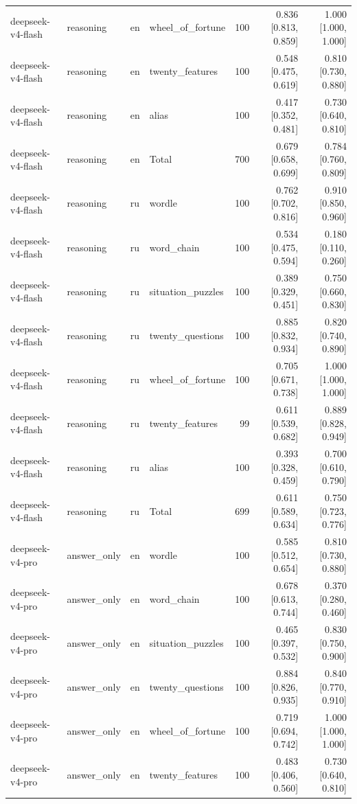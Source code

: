 \begin{longtable}{llllrrr}
deepseek-v4-flash & reasoning & en & wheel\_of\_fortune & 100 & 0.836 [0.813, 0.859] & 1.000 [1.000, 1.000] \\
deepseek-v4-flash & reasoning & en & twenty\_features & 100 & 0.548 [0.475, 0.619] & 0.810 [0.730, 0.880] \\
deepseek-v4-flash & reasoning & en & alias & 100 & 0.417 [0.352, 0.481] & 0.730 [0.640, 0.810] \\
deepseek-v4-flash & reasoning & en & Total & 700 & 0.679 [0.658, 0.699] & 0.784 [0.760, 0.809] \\
deepseek-v4-flash & reasoning & ru & wordle & 100 & 0.762 [0.702, 0.816] & 0.910 [0.850, 0.960] \\
deepseek-v4-flash & reasoning & ru & word\_chain & 100 & 0.534 [0.475, 0.594] & 0.180 [0.110, 0.260] \\
deepseek-v4-flash & reasoning & ru & situation\_puzzles & 100 & 0.389 [0.329, 0.451] & 0.750 [0.660, 0.830] \\
deepseek-v4-flash & reasoning & ru & twenty\_questions & 100 & 0.885 [0.832, 0.934] & 0.820 [0.740, 0.890] \\
deepseek-v4-flash & reasoning & ru & wheel\_of\_fortune & 100 & 0.705 [0.671, 0.738] & 1.000 [1.000, 1.000] \\
deepseek-v4-flash & reasoning & ru & twenty\_features & 99 & 0.611 [0.539, 0.682] & 0.889 [0.828, 0.949] \\
deepseek-v4-flash & reasoning & ru & alias & 100 & 0.393 [0.328, 0.459] & 0.700 [0.610, 0.790] \\
deepseek-v4-flash & reasoning & ru & Total & 699 & 0.611 [0.589, 0.634] & 0.750 [0.723, 0.776] \\
deepseek-v4-pro & answer\_only & en & wordle & 100 & 0.585 [0.512, 0.654] & 0.810 [0.730, 0.880] \\
deepseek-v4-pro & answer\_only & en & word\_chain & 100 & 0.678 [0.613, 0.744] & 0.370 [0.280, 0.460] \\
deepseek-v4-pro & answer\_only & en & situation\_puzzles & 100 & 0.465 [0.397, 0.532] & 0.830 [0.750, 0.900] \\
deepseek-v4-pro & answer\_only & en & twenty\_questions & 100 & 0.884 [0.826, 0.935] & 0.840 [0.770, 0.910] \\
deepseek-v4-pro & answer\_only & en & wheel\_of\_fortune & 100 & 0.719 [0.694, 0.742] & 1.000 [1.000, 1.000] \\
deepseek-v4-pro & answer\_only & en & twenty\_features & 100 & 0.483 [0.406, 0.560] & 0.730 [0.640, 0.810] \\

\end{longtable}
